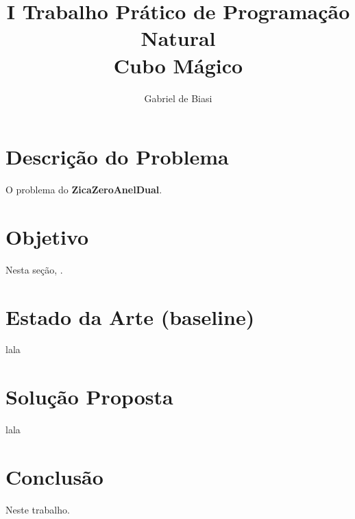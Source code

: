 \documentclass[12pt]{article}
\title{I Trabalho Prático de Programação Natural\\Cubo Mágico}
\author{Gabriel de Biasi\inst{1}}
\begin{document}
\maketitle

\section{Descrição do Problema}
  O problema do \textbf{ZicaZeroAnelDual}.

\section{Objetivo}
  Nesta seção, \cite{cormen2009}.

\section{Estado da Arte (baseline)}
  lala

\section{Solução Proposta}
  lala

\section{Conclusão}
  Neste trabalho.



\end{document}
